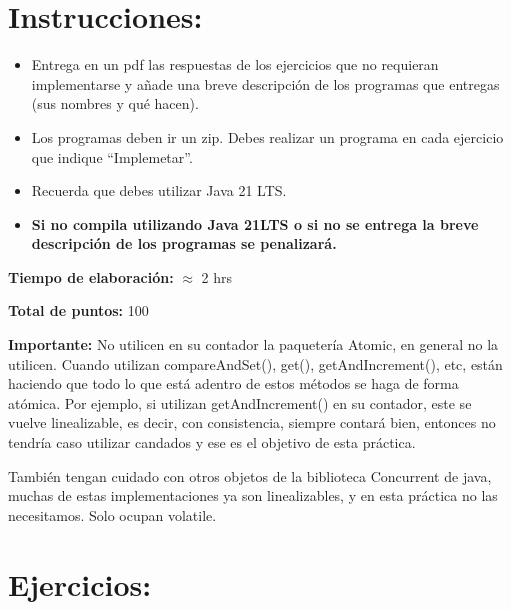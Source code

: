 \section*{Instrucciones:}

\begin{itemize}
    \item Entrega en un pdf las respuestas de los ejercicios que no requieran implementarse y añade una breve descripción de los programas que entregas (sus nombres y qué hacen).
    
    \item Los programas deben ir un zip. Debes realizar un programa en cada ejercicio que indique “Implemetar”.

    \item Recuerda que debes utilizar Java 21 LTS.

    \item \textbf{Si no compila utilizando Java 21LTS o si no se entrega la breve descripción de los
    programas se penalizará.}
\end{itemize}

\textbf{Tiempo de elaboración:} $\approx$ 2 hrs

\textbf{Total de puntos:} 100

\textbf{Importante:} No utilicen en su contador la paquetería Atomic, en general no la utilicen. Cuando utilizan compareAndSet(), get(), getAndIncrement(), etc, están haciendo que todo lo que está adentro de estos métodos se haga de forma atómica. Por ejemplo, si utilizan getAndIncrement() en su contador, este se vuelve linealizable, es decir, con consistencia, siempre contará bien, entonces no tendría caso utilizar candados y ese es el objetivo de esta práctica.

También tengan cuidado con otros objetos de la biblioteca Concurrent de java, muchas de estas implementaciones ya son linealizables, y en esta práctica no las necesitamos. Solo ocupan volatile.

\section*{Ejercicios:}

